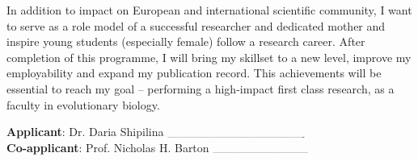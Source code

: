 \documentclass[11pt,a4paper]{article}
\begin{document}
In addition to impact on European and international scientific community, I want to serve as a role model of a successful researcher and dedicated mother and inspire young students (especially female) follow a research career. After completion of this programme, I will bring my skillset to a new level,  improve my employability and expand my publication record. This achievements will be essential to reach my goal – performing a high-impact first class research, as a faculty in evolutionary biology. 

\vspace{40pt}
{ \textbf{Applicant}: Dr. Daria Shipilina $_\text{----------------------------------------------------}$ \\

\textbf{Co-applicant}: Prof. Nicholas H. Barton $_\text{------------------------------------}$ }


\end{document}
